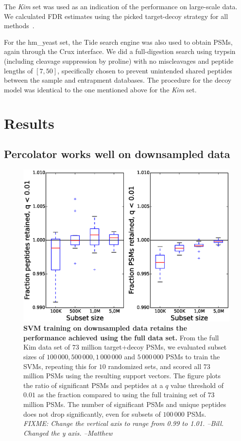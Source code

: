 \documentclass{article}
\begin{document}
The {\em Kim} set was used as an indication of the performance on
large-scale data. We calculated FDR estimates
using the picked target-decoy strategy for all
methods~\cite{savitski2015scalable}.

For the hm\_yeast set, the Tide search engine was also used to obtain
PSMs, again through the Crux interface. We did a full-digestion search
using trypsin (including cleavage suppression by proline) with no
miscleavages and peptide lengths of $[7,50]$, specifically chosen to
prevent unintended shared peptides between the sample and entrapment
databases. The procedure for the decoy model was identical to the one 
mentioned above for the {\em Kim} set.

\section*{Results}

\subsection*{Percolator works well on downsampled data}

\begin{figure}
\begin{center}
\includegraphics[width=0.6\linewidth]{./img/subset-performance}
\caption{\label{fig:subset}\textbf{SVM training on downsampled data
    retains the performance achieved using the full data set.}  From
  the full Kim data set of $73$ million target+decoy PSMs, we
  evaluated subset sizes of $100\,000, 500\,000, 1\,000\,000$ and
  $5\,000\,000$ PSMs to train the SVMs, repeating this for $10$
  randomized sets, and scored all $73$ million PSMs using the
  resulting support vectors. The figure plots the ratio of significant PSMs
  and peptides at a $q$ value threshold of $0.01$ as the fraction
  compared to using the full training set of $73$ million PSMs. The
  number of significant PSMs and unique peptides does not drop
  significantly, even for subsets of $100\,000$ PSMs. {\em FIXME:
    Change the vertical axis to range from 0.99 to 1.01. --Bill. 
Changed the y axis. --Matthew}}
\end{center}
\end{figure}
\end{document}
